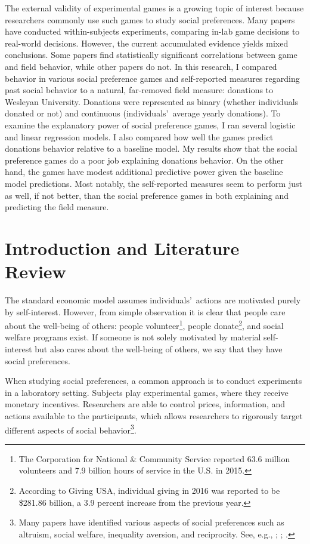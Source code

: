 \documentclass[12pt]{article}
\begin{document}
The external validity of experimental games is a growing topic of interest because researchers commonly use such games to study social preferences. Many papers have conducted within-subjects experiments, comparing in-lab game decisions to real-world decisions. However, the current accumulated evidence yields mixed conclusions. Some papers find statistically significant correlations between game and field behavior, while other papers do not. In this research, I compared behavior in various social preference games and self-reported measures regarding past social behavior to a natural, far-removed field measure: donations to Wesleyan University. Donations were represented as binary (whether individuals donated or not) and continuous (individuals\rq \ average yearly donations). To examine the explanatory power of social preference games, I ran several logistic and linear regression models. I also compared how well the games predict donations behavior relative to a baseline model. My results show that the social preference games do a poor job explaining donations behavior. On the other hand, the games have modest additional predictive power given the baseline model predictions. Most notably, the self-reported measures seem to perform just as well, if not better, than the social preference games in both explaining and predicting the field measure. 



\newpage


\doublespacing
\section{Introduction and Literature Review}

The standard economic model assumes individuals\rq \ actions are motivated purely by self-interest. However, from simple observation it is clear that people care about the well-being of others: people volunteer\footnote{The Corporation for National \& Community Service reported 63.6 million volunteers and 7.9 billion hours of service in the U.S. in 2015.}, people donate\footnote{According to Giving USA, individual giving in 2016 was reported to be \$281.86 billion, a 3.9 percent increase from the previous year.}, and social welfare programs exist. If someone is not solely motivated by material self-interest but also cares about the well-being of others, we say that they have social preferences. 

When studying social preferences, a common approach is to conduct experiments in a laboratory setting. Subjects play experimental games, where they receive monetary incentives. Researchers are able to control prices, information, and actions available to the participants, which allows researchers to rigorously target different aspects of social behavior\footnote{Many papers have identified various aspects of social preferences such as altruism, social welfare, inequality aversion, and reciprocity. See, e.g., \cite{charness_rabin_2002}; \cite{rabin_1993}; \cite{fisman_jakiela_kariv_2014}.}.
\end{document}
